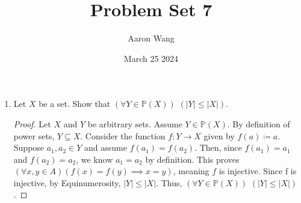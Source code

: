 \documentclass{article}
\title{Problem Set 7}
\author{Aaron Wang}
\date{March 25 2024}
\newcommand{\defeq}{\coloneqq}
\newcommand{\power}{\mathbb{P}}
\begin{document}
\maketitle

\begin{enumerate}
    \item Let $X$ be a set. Show that $(\forall Y \in \power(X))$ $(|Y| \leq |X|)$.
    \begin{proof}
        Let $X$ and $Y$ be arbitrary sets. Assume $Y \in \power(X)$. By definition of power sets, $Y \subseteq X$. Consider the function $f: Y \to X$ given by $f(a) \defeq a$. Suppose $a_1,a_2 \in Y$ and assume $f(a_1)=f(a_2)$. Then, since $f(a_1) = a_1$ and $f(a_2) = a_2$, we know $a_1=a_2$ by definition. This proves $(\forall x, y \in A)(f(x) = f(y) \implies x = y)$, meaning $f$ is injective. Since f is injective, by Equinumerosity, $|Y|\leq|X|$. Thus, $(\forall Y \in \power(X))$ $(|Y| \leq |X|)$.
    \end{proof}
    

\end{enumerate}
\end{document}
